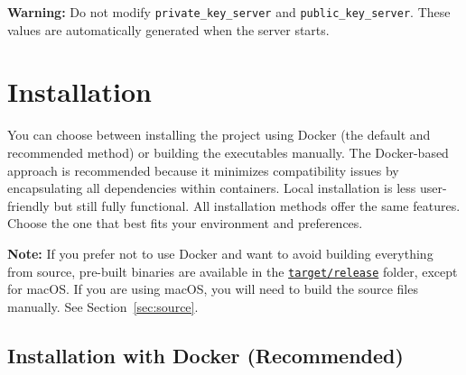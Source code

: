 \noindent
\begin{myWarning}
\textbf{Warning:} Do not modify \texttt{private\_key\_server} and \texttt{public\_key\_server}. These values are automatically generated when the server starts.
\end{myWarning}

\section{Installation}

You can choose between installing the project using Docker (the default and recommended method) or building the executables manually.  
The Docker-based approach is recommended because it minimizes compatibility issues by encapsulating all dependencies within containers.  
Local installation is less user-friendly but still fully functional.  
All installation methods offer the same features. Choose the one that best fits your environment and preferences.

\vspace{10pt}
\noindent
\begin{myNote}
\textbf{Note:} If you prefer not to use Docker and want to avoid building everything from source, pre-built binaries are available in the \href{https://github.com/christiansassi/advanced-programming-of-cryptographic-methods-project/tree/main/target/release}{\texttt{target/release}} folder, except for macOS. If you are using macOS, you will need to build the source files manually. See Section~\ref{sec:source}.
\end{myNote}

\subsection{Installation with Docker (Recommended)}
\label{sec:docker}

